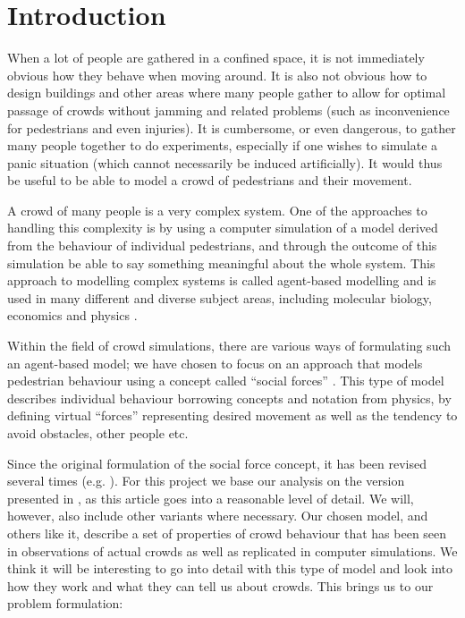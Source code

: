 \section{Introduction}
When a lot of people are gathered in a confined space, it is not immediately
obvious how they behave when moving around. It is also not obvious how to
design buildings and other areas where many people gather to allow for optimal
passage of crowds without jamming and related problems (such as inconvenience
for pedestrians and even injuries). It is cumbersome, or even dangerous, to
gather many people together to do experiments, especially if one wishes to
simulate a panic situation (which cannot necessarily be induced artificially).
It would thus be useful to be able to model a crowd of pedestrians and their
movement.

A crowd of many people is a very complex system. One of the approaches to
handling this complexity is by using a computer simulation of a model derived
from the behaviour of individual pedestrians, and through the outcome of this
simulation be able to say something meaningful about the whole system. This
approach to modelling complex systems is called agent-based modelling and is
used in many different and diverse subject areas, including molecular biology,
economics and physics \cite{simintro,finans,fish}.

Within the field of crowd simulations, there  are various ways of formulating
such an agent-based model; we have chosen to focus on an approach that models
pedestrian behaviour using a concept called ``social forces''
\cite{social-force}. This type of model describes individual behaviour
borrowing concepts and notation from physics, by defining  virtual ``forces''
representing desired movement as well as the tendency to avoid obstacles,
other people etc.

Since the original formulation of the social force concept, it has been
revised several times (e.g.  \cite{helbing00}). For this project we base our
analysis on the  version presented in \cite{self-org}, as this article goes
into a reasonable level of detail. We will, however, also include other
variants where necessary.  Our chosen model, and others like it, describe a
set of properties of crowd behaviour that has been seen in observations of
actual crowds as well as replicated in computer simulations.  We think it will
be interesting to go into detail with this type of model and look into how
they work and what they can tell us about crowds. This brings us to our
problem formulation:

